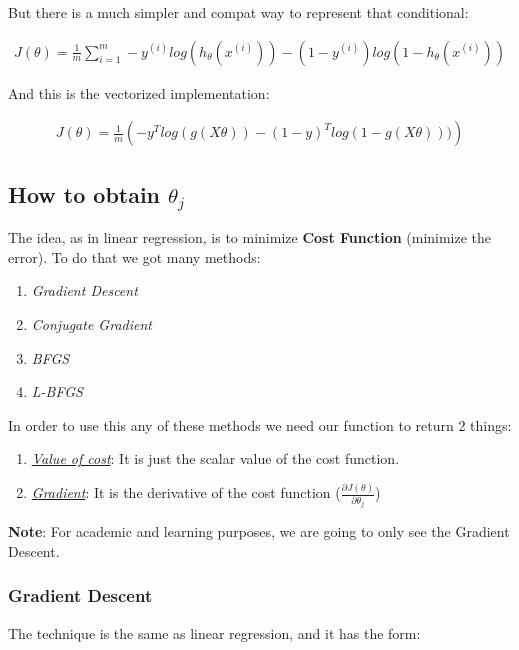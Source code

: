 \noindent But there is a much simpler and compat way to represent that conditional:

\begin{align}
	J(\theta) = \frac{1}{m} \sum_{i=1}^{m} -y^{(i)}log(h_{\theta}(x^{(i)})) - (1-y^{(i)})log(1 - h_{\theta}(x^{(i)}))
	\label{logistic-regression}
\end{align}

\noindent And this is the vectorized implementation:

\begin{align}
	J(\theta) = \frac{1}{m} \left(-y^Tlog(g(X\theta)) - (1 - y)^Tlog(1 - g(X\theta)))\right)
\end{align}

\subsection{How to obtain $\theta_{j}$}
The idea, as in linear regression, is to minimize \textbf{Cost Function} (minimize the error). To do that we got many methods:

\begin{enumerate}[label=\textbullet]
	\item \textit{Gradient Descent}
	\item \textit{Conjugate Gradient}
	\item \textit{BFGS}
	\item \textit{L-BFGS}
\end{enumerate}

\noindent In order to use this any of these methods we need our function to return 2 things:

\begin{enumerate}[label=\arabic*.]
	\item \underline{\textit{Value of cost}}: It is just the scalar value of the cost function.
	\item \underline{\textit{Gradient}}: It is the derivative of the cost function ($\frac{\partial{J(\theta)}}{\partial{\theta_j}}$)
\end{enumerate}


\noindent \textbf{Note}: For academic and learning purposes, we are going to only see the Gradient Descent.

\subsubsection{Gradient Descent}
The technique is the same as linear regression, and it has the form:

